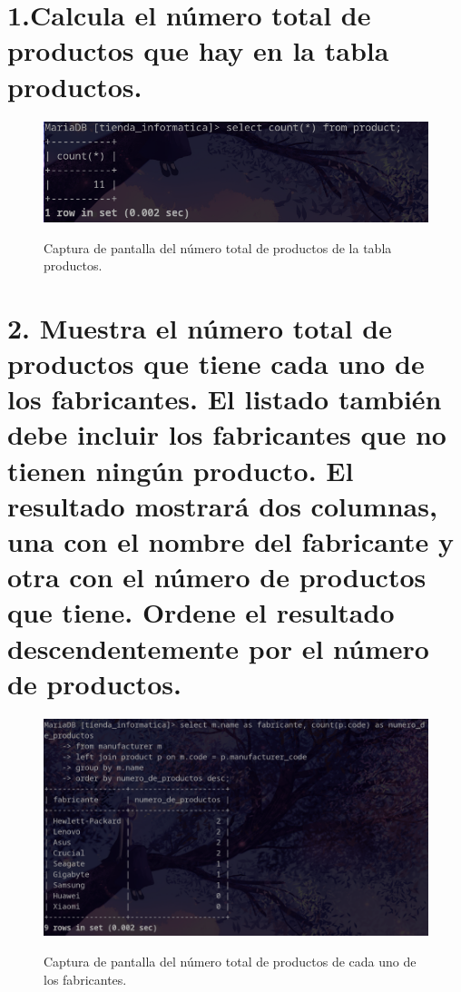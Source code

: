 \documentclass{article}
\begin{document}
\newpage %

\section*{1.Calcula el número total de productos que hay en la tabla productos.}


\begin{figure}[ht]
    \centering
    {
        \includegraphics[width=\linewidth]{01screenshot.png} %
    }
    \caption{Captura de pantalla del número total de productos de la tabla productos.}
\end{figure}

\newpage %

\section*{2. Muestra el número total de productos que tiene cada uno de los fabricantes. 
El listado también debe incluir los fabricantes que no tienen ningún producto. 
El resultado mostrará dos columnas, una con el nombre del fabricante y otra con 
el número de productos que tiene. Ordene el resultado descendentemente por el número de productos.}

\begin{figure}[ht]
    \centering
    {
        \includegraphics[width=\linewidth]{02screenshot.png} %
    }
    \caption{Captura de pantalla del número total de productos de cada uno de los fabricantes.}
\end{figure}
\end{document}
